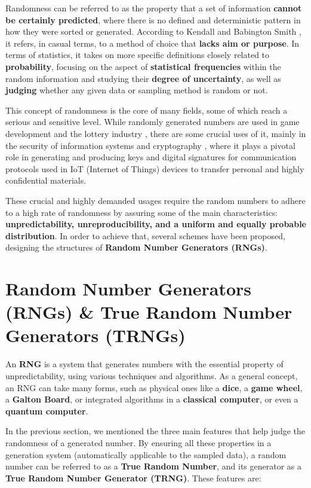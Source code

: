 
Randomness can be referred to as the property that a set of information \textbf{cannot be certainly predicted}, where there is no defined and deterministic pattern in how they were sorted or generated. According to Kendall and Babington Smith \cite{489b709a-b56c-3c3f-bfcb-5d1507b7d20e}, it refers, in casual terms, to a method of choice that \textbf{lacks aim or purpose}. In terms of statistics, it takes on more specific definitions closely related to \textbf{probability}, focusing on the aspect of \textbf{statistical frequencies} within the random information and studying their \textbf{degree of uncertainty}, as well as \textbf{judging} whether any given data or sampling method is random or not.

This concept of randomness is the core of many fields, some of which reach a serious and sensitive level. While randomly generated numbers are used in game development and the lottery industry \cite{10.1007/978-981-15-4474-3_4}, there are some crucial uses of it, mainly in the security of information systems \cite{Shanon} and cryptography \cite{Crypto}, where it plays a pivotal role in generating and producing keys and digital signatures for communication protocols used in IoT (Internet of Things) devices to transfer personal and highly confidential materials.

These crucial and highly demanded usages require the random numbers to adhere to a high rate of randomness by assuring some of the main characteristics: \textbf{unpredictability, unreproducibility, and a uniform and equally probable distribution}. In order to achieve that, several schemes have been proposed, designing the structures of \textbf{Random Number Generators (RNGs)}.



\section{Random Number Generators (RNGs) \& True Random Number Generators (TRNGs)}
An \textbf{RNG} is a system that generates numbers with the essential property of unpredictability, using various techniques and algorithms. As a general concept, an RNG can take many forms, such as physical ones like a \textbf{dice}, a \textbf{game wheel}, a \textbf{Galton Board}, or integrated algorithms in a \textbf{classical computer}, or even a \textbf{quantum computer}.

In the previous section, we mentioned the three main features that help judge the randomness of a generated number. By ensuring all these properties in a generation system (automatically applicable to the sampled data), a random number can be referred to as a \textbf{True Random Number}, and its generator as a \textbf{True Random Number Generator (TRNG)}. These features are:

